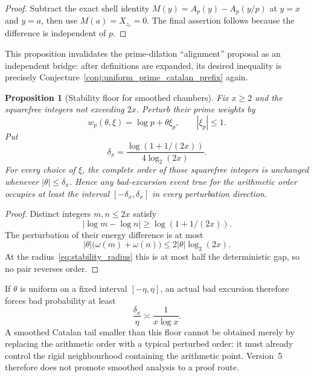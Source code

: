 \documentclass[11pt]{amsart}
\numberwithin{equation}{section}
\theoremstyle{plain}
\newtheorem{proposition}[theorem]{Proposition}
\theoremstyle{definition}
\theoremstyle{remark}
\newcommand{\Mert}{M}
\begin{document}
\begin{proof}
Subtract the exact shell identity
$\Mert(y)=A_p(y)-A_p(y/p)$ at $y=x$ and $y=a$, then use
$\Mert(a)=X_{z_r}=0$.  The final assertion follows because the difference is
independent of $p$.
\end{proof}

This proposition invalidates the prime-dilation ``alignment'' proposal as an
independent bridge: after definitions are expanded, its desired inequality is
precisely Conjecture~\ref{conj:uniform_prime_catalan_prefix} again.

\begin{proposition}[Stability floor for smoothed chambers]
\label{prop:stability_floor}
Fix $x\geq2$ and the squarefree integers not exceeding $2x$.  Perturb their
prime weights by
\begin{equation}
w_p(\theta,\xi)=\log p+\theta\xi_p,
\qquad |\xi_p|\leq1.
\end{equation}
Put
\begin{equation}
\delta_x=
\frac{\log(1+1/(2x))}{4\log_2(2x)}.
\label{eq:stability_radius}
\end{equation}
For every choice of $\xi$, the complete order of those squarefree integers is
unchanged whenever $|\theta|\leq\delta_x$.  Hence any bad-excursion event true
for the arithmetic order occupies at least the interval
$[-\delta_x,\delta_x]$ in every perturbation direction.
\end{proposition}

\begin{proof}
Distinct integers $m,n\leq2x$ satisfy
\begin{equation}
|\log m-\log n|\geq\log(1+1/(2x)).
\end{equation}
The perturbation of their energy difference is at most
\begin{equation}
|\theta|\bigl(\omega(m)+\omega(n)\bigr)
\leq2|\theta|\log_2(2x).
\end{equation}
At the radius~\eqref{eq:stability_radius} this is at most half the deterministic
gap, so no pair reverses order.
\end{proof}

If $\theta$ is uniform on a fixed interval $[-\eta,\eta]$, an actual bad
excursion therefore forces bad probability at least
\begin{equation}
\frac{\delta_x}{\eta}\asymp\frac1{x\log x}.
\label{eq:stability_probability_floor}
\end{equation}
A smoothed Catalan tail smaller than this floor cannot be obtained merely by
replacing the arithmetic order with a typical perturbed order: it must already
control the rigid neighbourhood containing the arithmetic point.  Version~5
therefore does not promote smoothed analysis to a proof route.
\end{document}
